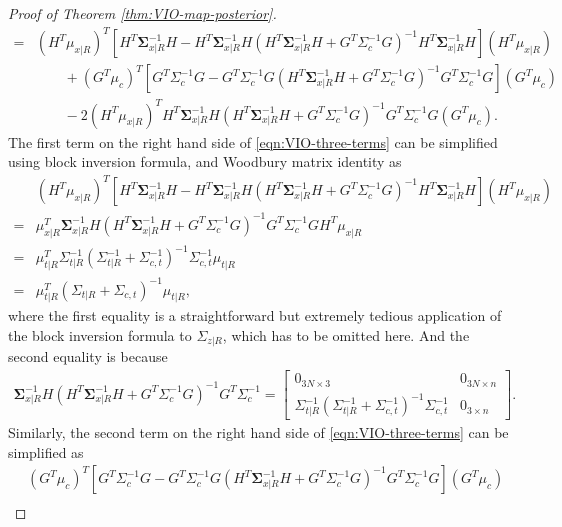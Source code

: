 \begin{proof}[Proof of Theorem \ref{thm:VIO-map-posterior}]
\begin{align}
		= &(H^T\mu_{x|R})^T \left[ H^T\bm{\Sigma}_{x|R}^{-1}H - H^T\bm{\Sigma}_{x|R}^{-1}H \left( H^T\bm{\Sigma}_{x|R}^{-1}H + G^T\Sigma_c^{-1}G \right)^{-1} H^T\bm{\Sigma}_{x|R}^{-1}H \right] (H^T\mu_{x|R}) \nonumber \\
		&\qquad + (G^T\mu_c)^T \left[ G^T\Sigma_c^{-1}G - G^T\Sigma_c^{-1}G \left( H^T\bm{\Sigma}_{x|R}^{-1}H + G^T\Sigma_c^{-1}G \right)^{-1} G^T\Sigma_c^{-1}G \right] (G^T\mu_c) \nonumber \\
		&\qquad -2 (H^T\mu_{x|R})^T H^T\bm{\Sigma}_{x|R}^{-1} H \left( H^T\bm{\Sigma}_{x|R}^{-1}H + G^T\Sigma_c^{-1}G \right)^{-1} G^T\Sigma_c^{-1}G (G^T\mu_c).
	\end{align}
	The first term on the right hand side of \eqref{eqn:VIO-three-terms} can be simplified using block inversion formula, and Woodbury matrix identity as
	\begin{align*}
		&(H^T\mu_{x|R})^T \left[ H^T\bm{\Sigma}_{x|R}^{-1}H - H^T\bm{\Sigma}_{x|R}^{-1}H \left( H^T\bm{\Sigma}_{x|R}^{-1}H + G^T\Sigma_c^{-1}G \right)^{-1} H^T\bm{\Sigma}_{x|R}^{-1}H \right] (H^T\mu_{x|R}) \\
		= &\mu_{x|R}^T \bm{\Sigma}_{x|R}^{-1}H \left( H^T\bm{\Sigma}_{x|R}^{-1}H + G^T\Sigma_c^{-1}G \right)^{-1} G^T\Sigma_c^{-1} GH^T\mu_{x|R} \\
		= &\mu_{t|R}^T \Sigma_{t|R}^{-1} \left( \Sigma_{t|R}^{-1} + \Sigma_{c,t}^{-1} \right)^{-1} \Sigma_{c,t}^{-1} \mu_{t|R} \\
		= &\mu_{t|R}^T (\Sigma_{t|R}+\Sigma_{c,t})^{-1} \mu_{t|R},
	\end{align*}
	where the first equality is a straightforward but extremely tedious application of the block inversion formula to $\Sigma_{z|R}$, which has to be omitted here.
	And the second equality is because
	\begin{align*}
		\bm{\Sigma}_{x|R}^{-1}H \left( H^T\bm{\Sigma}_{x|R}^{-1}H + G^T\Sigma_c^{-1}G \right)^{-1} G^T\Sigma_c^{-1} = \begin{bmatrix} 0_{3N\times 3} & 0_{3N\times n} \\ \Sigma_{t|R}^{-1} \left( \Sigma_{t|R}^{-1} + \Sigma_{c,t}^{-1} \right)^{-1} \Sigma_{c,t}^{-1} & 0_{3\times n} \end{bmatrix}.
	\end{align*}
	Similarly, the second term on the right hand side of \eqref{eqn:VIO-three-terms} can be simplified as
	\begin{align*}
		&(G^T\mu_c)^T \left[ G^T\Sigma_c^{-1}G - G^T\Sigma_c^{-1}G \left( H^T\bm{\Sigma}_{x|R}^{-1}H + G^T\Sigma_c^{-1}G \right)^{-1} G^T\Sigma_c^{-1}G \right] (G^T\mu_c) \\

\end{align*}
\end{proof}
